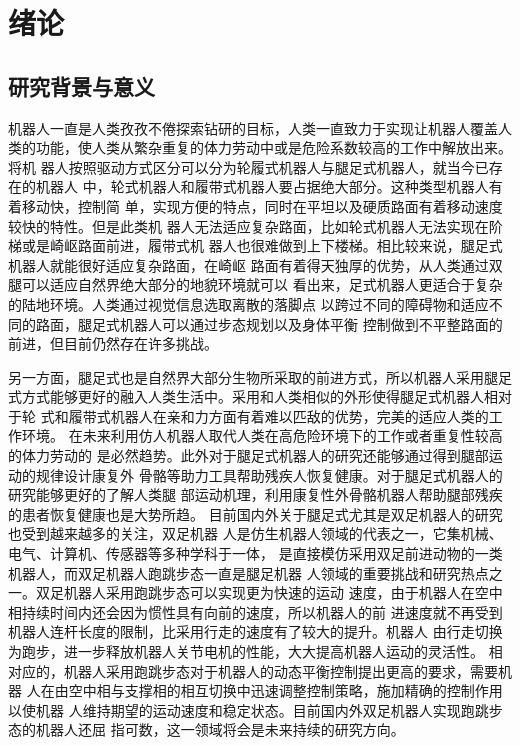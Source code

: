 \newcommand{\aref}[1]{\autoref{#1}\space}
\renewcommand{\algorithmcfname}{算法}
\chapter{绪论}
\section{研究背景与意义}
机器人一直是人类孜孜不倦探索钻研的目标，人类一直致力于实现让机器人覆盖人
类的功能，使人类从繁杂重复的体力劳动中或是危险系数较高的工作中解放出来。将机
器人按照驱动方式区分可以分为轮履式机器人与腿足式机器人，就当今已存在的机器人
中，轮式机器人和履带式机器人要占据绝大部分。这种类型机器人有着移动快，控制简
单，实现方便的特点，同时在平坦以及硬质路面有着移动速度较快的特性。但是此类机
器人无法适应复杂路面，比如轮式机器人无法实现在阶梯或是崎岖路面前进，履带式机
器人也很难做到上下楼梯。相比较来说，腿足式机器人就能很好适应复杂路面，在崎岖
路面有着得天独厚的优势，从人类通过双腿可以适应自然界绝大部分的地貌环境就可以
看出来，足式机器人更适合于复杂的陆地环境\cite{schraft2000service}。人类通过视觉信息选取离散的落脚点
以跨过不同的障碍物和适应不同的路面，腿足式机器人可以通过步态规划以及身体平衡
控制做到不平整路面的前进，但目前仍然存在许多挑战。

另一方面，腿足式也是自然界大部分生物所采取的前进方式，所以机器人采用腿足
式方式能够更好的融入人类生活中。采用和人类相似的外形使得腿足式机器人相对于轮
式和履带式机器人在亲和力方面有着难以匹敌的优势，完美的适应人类的工作环境\cite{2010067776.nh}。
在未来利用仿人机器人取代人类在高危险环境下的工作或者重复性较高的体力劳动的
是必然趋势。此外对于腿足式机器人的研究还能够通过得到腿部运动的规律设计康复外
骨骼等助力工具帮助残疾人恢复健康。对于腿足式机器人的研究能够更好的了解人类腿
部运动机理，利用康复性外骨骼机器人帮助腿部残疾的患者恢复健康也是大势所趋。
目前国内外关于腿足式尤其是双足机器人的研究也受到越来越多的关注，双足机器
人是仿生机器人领域的代表之一，它集机械、电气、计算机、传感器等多种学科于一体，
是直接模仿采用双足前进动物的一类机器人\cite{梶田秀司2007仿人机器人}，而双足机器人跑跳步态一直是腿足机器
人领域的重要挑战和研究热点之一。双足机器人采用跑跳步态可以实现更为快速的运动
速度，由于机器人在空中相持续时间内还会因为惯性具有向前的速度，所以机器人的前
进速度就不再受到机器人连杆长度的限制，比采用行走的速度有了较大的提升。机器人
由行走切换为跑步，进一步释放机器人关节电机的性能，大大提高机器人运动的灵活性。
相对应的，机器人采用跑跳步态对于机器人的动态平衡控制提出更高的要求，需要机器
人在由空中相与支撑相的相互切换中迅速调整控制策略，施加精确的控制作用以使机器
人维持期望的运动速度和稳定状态。目前国内外双足机器人实现跑跳步态的机器人还屈
指可数，这一领域将会是未来持续的研究方向。

